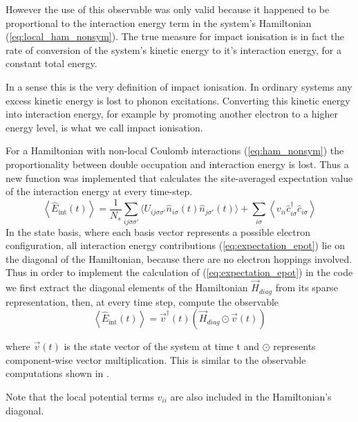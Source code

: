 However the use of this observable was only valid because it happened to be proportional to the interaction energy term in the system's Hamiltonian (\ref{eq:local_ham_nonsym}). The true measure for impact ionisation is in fact the rate of conversion of the system's kinetic energy to it's interaction energy, for a constant total energy.

\medskip
In a sense this is the very definition of impact ionisation. In ordinary systems any excess kinetic energy is lost to phonon excitations. Converting this kinetic energy into interaction energy, for example by promoting another electron to a higher energy level, is what we call impact ionisation.
\medskip

For a Hamiltonian with non-local Coulomb interactions (\ref{eq:ham_nonsym}) the proportionality between double occupation and interaction energy is lost. Thus a new function was implemented that calculates the site-averaged expectation value of the interaction energy at every time-step.
\begin{equation}
    \left\langle{\hat{E}_{\text{int}}(t)}\right\rangle = \frac{1}{N_s} \sum_{ij\sigma\sigma'} \Big\langle{U_{ij\sigma\sigma'}\hat{n}_{i \sigma}(t) \hat{n}_{j\sigma'}(t)}\Big\rangle + \sum_{i\sigma} \left\langle v_{ii} \hat{c}_{i \sigma}^{\dagger} \hat{c}_{i \sigma}\right\rangle
    \label{eq:expectation_epot}
\end{equation}
In the state basis, where each basis vector represents a possible electron configuration, all interaction energy contributions (\ref{eq:expectation_epot}) lie on the diagonal of the Hamiltonian, because there are no electron hoppings involved. Thus in order to implement the calculation of (\ref{eq:expectation_epot}) in the code we first extract the diagonal elements of the Hamiltonian $\vec{H}_{diag}$ from its sparse representation, then, at every time step, compute the observable
\begin{equation}
     \left\langle{\hat{E}_{\text{int}}(t)}\right\rangle = \vec{v}^\dagger(t) \left(\vec{H}_{diag} \odot \vec{v}(t)\right) 
     \label{eq:expecation_epot_code}
\end{equation}

where $\vec{v}(t)$ is the state vector of the system at time t and $\odot$ represents component-wise vector multiplication. This is similar to the observable computations shown in \cite{innerberger}.
\medskip

Note that the local potential terms $v_{ii}$ are also included in the Hamiltonian's diagonal.


